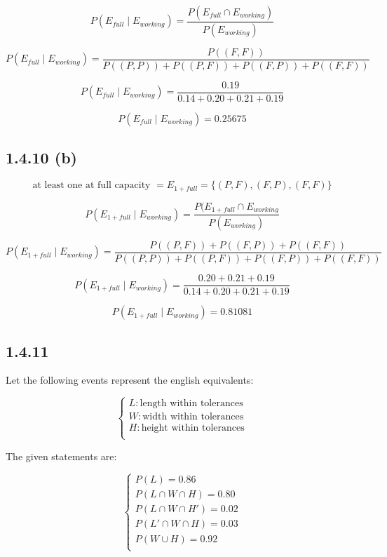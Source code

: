 \documentclass{article}
\begin{document}
\[
P\left(E_{full}\mid E_{working}\right) =
\frac{P(E_{full}\cap E_{working})}{P(E_{working})}
\]

\[
P\left(E_{full}\mid E_{working}\right) =
\frac
    {P((F, F))}
    {P((P, P)) + P((P, F)) + P((F, P)) + P((F, F))}
\]

\[
P\left(E_{full}\mid E_{working}\right) =
\frac
    {0.19}
    {0.14 + 0.20 + 0.21 + 0.19}
\]

\[
\boxed{P\left(E_{full}\mid E_{working}\right) = 0.25675}
\]

\subsection*{1.4.10 (b)}

\[
\text{at least one at full capacity } = E_{1+ full} = \{(P, F), (F, P), (F, F)\}
\]

\[
P\left(E_{1+ full}\mid E_{working}\right) =
\frac
    {P(E_{1+ full}\cap E_{working}}
    {P(E_{working})}
\]

\[
P\left(E_{1+ full}\mid E_{working}\right) =
\frac
    {P((P, F)) + P((F, P)) + P((F, F))}
    {P((P, P)) + P((P, F)) + P((F, P)) + P((F, F))}
\]

\[
P\left(E_{1+ full}\mid E_{working}\right) =
\frac
    {0.20 + 0.21 + 0.19}
    {0.14 + 0.20 + 0.21 + 0.19}
\]

\[
\boxed{P\left(E_{1+ full}\mid E_{working}\right) = 0.81081}
\]

\subsection*{1.4.11}

Let the following events represent the english equivalents:

\[
\begin{cases}
L: \text{length within tolerances} \\
W: \text{width within tolerances} \\
H: \text{height within tolerances} \\
\end{cases}
\]

The given statements are:

\[
\begin{cases}
P(L) = 0.86 \\
P(L\cap W\cap H) = 0.80 \\
P(L\cap W\cap H') = 0.02 \\
P(L'\cap W\cap H) = 0.03 \\
P(W\cup H) = 0.92 \\
\end{cases}
\]
\end{document}

